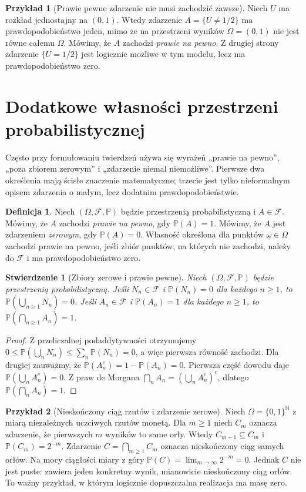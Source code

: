 \documentclass[11pt,a4paper,oneside]{report}
\numberwithin{equation}{chapter}
\theoremstyle{plain}
\newtheorem{stwierdzenie}[twierdzenie]{Stwierdzenie}
\theoremstyle{definition}
\newtheorem{definicja}{Definicja}[chapter]
\newtheorem{przyklad}{Przykład}[chapter]
\theoremstyle{remark}
\newcommand{\Prob}{\mathbb{P}}
\begin{document}
\begin{przyklad}[Prawie pewne zdarzenie nie musi zachodzić zawsze]
Niech $U$ ma rozkład jednostajny na $(0,1)$.
Wtedy zdarzenie $A=\{U\neq1/2\}$ ma prawdopodobieństwo
jeden, mimo że na przestrzeni wyników $\Omega=(0,1)$
nie jest równe całemu $\Omega$. Mówimy, że $A$ zachodzi
\emph{prawie na pewno}. Z drugiej strony zdarzenie
$\{U=1/2\}$ jest logicznie możliwe w tym modelu,
lecz ma prawdopodobieństwo zero.
\end{przyklad}


\section{Dodatkowe własności przestrzeni probabilistycznej}
Często przy formułowaniu twierdzeń używa się wyrażeń
„prawie na pewno”, „poza zbiorem zerowym” i „zdarzenie
niemal niemożliwe”. Pierwsze dwa określenia mają ścisłe
znaczenie matematyczne; trzecie jest tylko nieformalnym
opisem zdarzenia o małym, lecz dodatnim prawdopodobieństwie.

\begin{definicja}
Niech $(\Omega,\mathcal F,\Prob)$ będzie przestrzenią
probabilistyczną i $A\in\mathcal F$. Mówimy, że $A$
zachodzi \emph{prawie na pewno}, gdy $\Prob(A)=1$.
Mówimy, że $A$ jest zdarzeniem \emph{zerowym}, gdy
$\Prob(A)=0$. Własność określona dla punktów $\omega\in\Omega$
zachodzi prawie na pewno, jeśli zbiór punktów, na których
nie zachodzi, należy do $\mathcal F$ i ma prawdopodobieństwo zero.
\end{definicja}

\begin{stwierdzenie}[Zbiory zerowe i prawie pewne]
Niech $(\Omega,\mathcal F,\Prob)$ będzie przestrzenią
probabilistyczną. Jeśli $N_n\in\mathcal F$ i
$\Prob(N_n)=0$ dla każdego $n\geq1$, to
$\Prob(\bigcup_{n\geq1}N_n)=0$. Jeśli $A_n\in\mathcal F$
i $\Prob(A_n)=1$ dla każdego $n\geq1$, to
$\Prob(\bigcap_{n\geq1}A_n)=1$.
\end{stwierdzenie}
\begin{proof}
Z przeliczalnej podaddytywności otrzymujemy
$0\leq\Prob(\bigcup_nN_n)\leq\sum_n\Prob(N_n)=0$,
a więc pierwsza równość zachodzi. Dla drugiej zauważmy,
że $\Prob(A_n^c)=1-\Prob(A_n)=0$. Pierwsza część
dowodu daje
$\Prob(\bigcup_n A_n^c)=0$. Z praw de Morgana
$\bigcap_n A_n=(\bigcup_n A_n^c)^c$, dlatego
$\Prob(\bigcap_n A_n)=1$.
\end{proof}

\begin{przyklad}[Nieskończony ciąg rzutów i zdarzenie zerowe]
Niech $\Omega=\{0,1\}^{\mathbb N}$ z miarą niezależnych
uczciwych rzutów monetą. Dla $m\geq1$ niech $C_m$
oznacza zdarzenie, że pierwszych $m$ wyników to same orły.
Wtedy $C_{m+1}\subseteq C_m$ i $\Prob(C_m)=2^{-m}$.
Zdarzenie $C=\bigcap_{m\geq1}C_m$ oznacza nieskończony
ciąg samych orłów. Na mocy ciągłości miary z góry
$\Prob(C)=\lim_{m\to\infty}2^{-m}=0$.
Jednak $C$ nie jest puste: zawiera jeden konkretny wynik,
mianowicie nieskończony ciąg orłów. To ważny przykład,
w którym logicznie dopuszczalna realizacja ma masę zero.
\end{przyklad}
\end{document}
